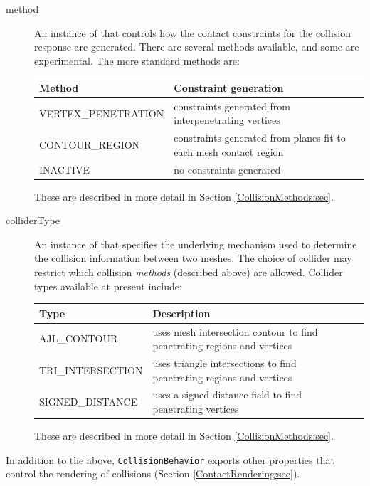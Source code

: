 \begin{description}
\item[method]\mbox{}

An instance of
 that
controls how the contact constraints for the collision response are
generated. There are several methods available, and some are
experimental. The more standard methods are:

\begin{tabular}{lll}
\hline
Method & Constraint generation \\
\hline
VERTEX\_PENETRATION & constraints generated from interpenetrating vertices\\
CONTOUR\_REGION & 
constraints generated from planes fit to each mesh contact region \\
INACTIVE & no constraints generated\\
\hline
\end{tabular}

These are described in more detail in 
Section \ref{CollisionMethods:sec}.

\item[colliderType]\mbox{}

An instance of
that specifies the underlying mechanism used to determine the
collision information between two meshes. The choice of collider may
restrict which collision {\it methods} (described above) are
allowed. Collider types available at present include:

\begin{tabular}{lll}
\hline
Type & Description \\
\hline
AJL\_CONTOUR & uses mesh intersection contour to find penetrating 
regions and vertices\\
TRI\_INTERSECTION & uses triangle intersections to find penetrating 
regions and vertices \\
SIGNED\_DISTANCE & uses a signed distance field to find penetrating vertices\\
\hline
\end{tabular}

These are described in more detail in 
Section \ref{CollisionMethods:sec}.

\end{description}

In addition to the above, {\tt CollisionBehavior} exports other
properties that control the rendering of collisions (Section
\ref{ContactRendering:sec}).

